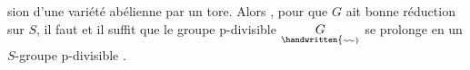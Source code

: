 %
%
sion d'une variété abélienne par un tore. Alors , pour que $G$  ait bonne
réduction  sur $S$, il faut et il suffit que le groupe p-divisible $\underset{\handwritten{\scriptscriptstyle\sim\!\sim}}{G}$ se
prolonge en un $S$-groupe p-divisible .
